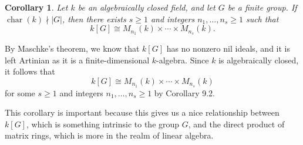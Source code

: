 \documentclass[10pt]{article}
\makeatletter
\numberwithin{equation}{section}
\DeclareMathOperator{\ch}{char}
\theoremstyle{newstyle}
\newtheorem{cor}[thm]{Corollary}
\newenvironment{pf}[1][\proofname]{\par
  \pushQED{\qed}%
  \normalfont \topsep0\p@\relax
  \trivlist
  \item[\hskip\labelsep\scshape
  #1\@addpunct{.}]\ignorespaces
}{%
  \popQED\endtrivlist\@endpefalse
}
\makeatother
\begin{document}
\begin{cor}
Let $k$ be an algebraically closed field, and let $G$ be a finite group. If $\ch(k) \nmid |G|$, then 
there exists $s \geq 1$ and integers $n_1, \dots, n_s \geq 1$ such that 
\[ k[G] \cong M_{n_1}(k) \times \cdots \times M_{n_s}(k). \]
\end{cor}
\begin{pf}
By Maschke's theorem, we know that $k[G]$ has no nonzero nil ideals, and it is left Artinian 
as it is a finite-dimensional $k$-algebra. Since $k$ is algebraically closed, it follows that 
\[ k[G] \cong M_{n_1}(k) \times \cdots \times M_{n_s}(k) \]
for some $s \geq 1$ and integers $n_1, \dots, n_s \geq 1$ by Corollary 9.2. 
\end{pf}

This corollary is important because this gives us a nice relationship between $k[G]$, which is 
something intrinsic to the group $G$, and the direct product of matrix rings, which is more in the 
realm of linear algebra. 
\end{document}
